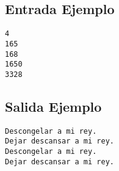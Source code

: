 \begin{multicols}{2}

\subsection*{Entrada Ejemplo}

\begin{verbatim}
4
165
168
1650
3328
\end{verbatim}

\columnbreak

\subsection*{Salida Ejemplo}

\begin{verbatim}
Descongelar a mi rey.
Dejar descansar a mi rey.
Descongelar a mi rey.
Dejar descansar a mi rey.
\end{verbatim}

\end{multicols}